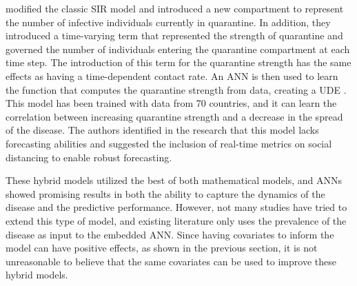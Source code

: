 \citeauthor{dandekarMachineLearningAidedGlobal2020a} \cite{dandekarMachineLearningAidedGlobal2020a} modified the classic \gls{SIR} model and introduced a new compartment to represent the number of infective individuals currently in quarantine.
In addition, they introduced a time-varying term that represented the strength of quarantine and governed the number of individuals entering the quarantine compartment at each time step.
The introduction of this term for the quarantine strength has the same effects as having a time-dependent contact rate.
An \gls{ANN} is then used to learn the function that computes the quarantine strength from data, creating a \gls{UDE} \cite{rackauckasUniversalDifferentialEquations2020}.
This model has been trained with data from 70 countries, and it can learn the correlation between increasing quarantine strength and a decrease in the spread of the disease.
The authors identified in the research that this model lacks forecasting abilities and suggested the inclusion of real-time metrics on social distancing to enable robust forecasting.

These hybrid models utilized the best of both mathematical models, and \glspl{ANN} showed promising results in both the ability to capture the dynamics of the disease and the predictive performance.
However, not many studies have tried to extend this type of model, and existing literature only uses the prevalence of the disease as input to the embedded \gls{ANN}.
Since having covariates to inform the model can have positive effects, as shown in the previous section, it is not unreasonable to believe that the same covariates can be used to improve these hybrid models.